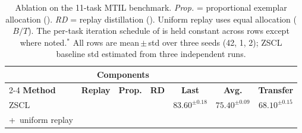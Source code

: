 \documentclass{article}
\begin{document}
  \begin{table}[t]                                          
  \centering                                                                                                                                                                                  
  \caption{Ablation on the 11-task MTIL benchmark. \textit{Prop.} = proportional                                                                                                              
  exemplar allocation (). \textit{RD} = replay distillation
  (). Uniform replay uses equal allocation ($B/T$). The                                                                                                                   
  per-task iteration schedule of  is held constant across
  rows except where noted.$^\ast$ All rows are mean\,$\pm$\,std over three seeds                                                                                                              
  (42, 1, 2); ZSCL baseline std estimated from three independent runs.}                                                                                                                       
  \label{tab:ablation}
  \begin{tabular}{lccc ccc}                                                                                                                                                                   
  \toprule        
  & \multicolumn{3}{c}{\textbf{Components}} & & & \\                                                                                                                                          
  \cmidrule(lr){2-4}
  \textbf{Method} & \textbf{Replay} & \textbf{Prop.} & \textbf{RD}                                                                                                                            
    & \textbf{Last} & \textbf{Avg.} & \textbf{Transfer} \\                                                                                                                                     
  \midrule
  ZSCL~\citep{zheng2023zscl}                                                                                                                                                                  
    & & & & $83.60^{\pm0.18}$ & $75.40^{\pm0.09}$ & $68.10^{\pm0.15}$ \\
  {+~uniform replay}                                                                                                                                                                          

\end{tabular}
\end{table}
\end{document}
